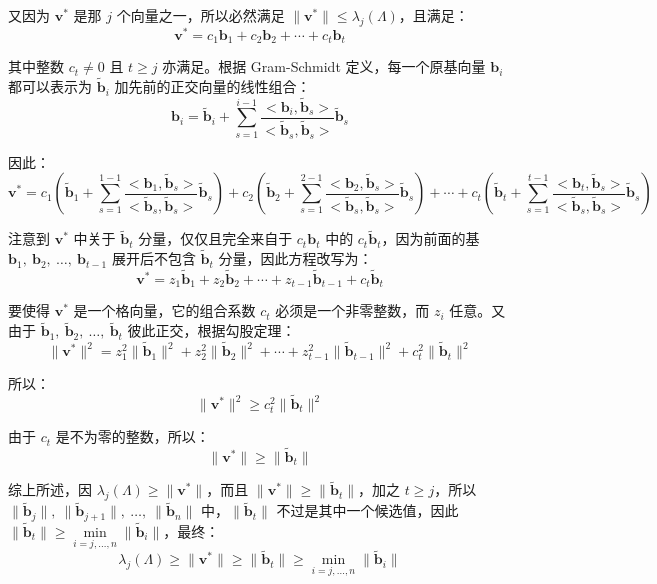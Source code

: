 \documentclass{article}
\begin{document}
又因为 $\bm{v}^*$ 是那 $j$ 个向量之一，所以必然满足 $\|\bm{v}^*\|\leqslant\lambda_j(\Lambda)$，且满足：
\[ \bm{v}^{*}=c_1\bm{b}_1+c_2\bm{b}_2+\cdots+c_t\bm{b}_t \]

其中整数 $c_t\neq0$ 且 $t\geqslant j$ 亦满足。根据 Gram-Schmidt 定义，每一个原基向量 $\bm{b}_i$ 都可以表示为 $\tilde{\bm{b}}_i$ 加先前的正交向量的线性组合：
\[ \bm{b}_i=\tilde{\bm{b}}_i+\sum_{s=1}^{i-1}\dfrac{<\bm{b}_i,\tilde{\bm{b}}_s>}{<\tilde{\bm{b}}_s,\tilde{\bm{b}}_s>}\tilde{\bm{b}}_s \]

因此：
\[ \bm{v}^{*}=c_1\left(\tilde{\bm{b}}_1+\sum_{s=1}^{1-1}\dfrac{<\bm{b}_1,\tilde{\bm{b}}_s>}{<\tilde{\bm{b}}_s,\tilde{\bm{b}}_s>}\tilde{\bm{b}}_s\right)+c_2\left(\tilde{\bm{b}}_2+\sum_{s=1}^{2-1}\dfrac{<\bm{b}_2,\tilde{\bm{b}}_s>}{<\tilde{\bm{b}}_s,\tilde{\bm{b}}_s>}\tilde{\bm{b}}_s\right)+\cdots+c_t\left(\tilde{\bm{b}}_t+\sum_{s=1}^{t-1}\dfrac{<\bm{b}_t,\tilde{\bm{b}}_s>}{<\tilde{\bm{b}}_s,\tilde{\bm{b}}_s>}\tilde{\bm{b}}_s\right) \]

注意到 $\bm{v}^{*}$ 中关于 $\tilde{\bm{b}}_t$ 分量，仅仅且完全来自于 $c_t\bm{b}_t$ 中的 $c_t\tilde{\bm{b}}_t$，因为前面的基 $\bm{b}_1,\ \bm{b}_2,\ \ldots,\ \bm{b}_{t-1}$ 展开后不包含 $\tilde{\bm{b}}_t$ 分量，因此方程改写为：
\[ \bm{v}^{*}=z_1\tilde{\bm{b}}_1+z_2\tilde{\bm{b}}_2+\cdots+z_{t-1}\tilde{\bm{b}}_{t-1}+c_t\tilde{\bm{b}}_t \]

要使得 $\bm{v}^{*}$ 是一个格向量，它的组合系数 $c_t$ 必须是一个非零整数，而 $z_i$ 任意。又由于 $\tilde{\bm{b}}_1,\ \tilde{\bm{b}}_2,\ \ldots,\ \tilde{\bm{b}}_t$ 彼此正交，根据勾股定理：
\[ \|\bm{v}^{*}\|^2=z_1^2\|\tilde{\bm{b}}_1\|^2+z_2^2\|\tilde{\bm{b}}_2\|^2+\cdots+z_{t-1}^2\|\tilde{\bm{b}}_{t-1}\|^2+c_t^2\|\tilde{\bm{b}}_t\|^2 \]

所以：
\[ \|\bm{v}^{*}\|^2\geqslant c_t^2\|\tilde{\bm{b}}_t\|^2 \]

由于 $c_t$ 是不为零的整数，所以：
\[ \|\bm{v}^{*}\|\geqslant\|\tilde{\bm{b}}_t\| \]

综上所述，因 $\lambda_j(\Lambda)\geqslant\|\bm{v}^*\|$，而且 $\|\bm{v}^*\|\geqslant\|\tilde{\bm{b}}_t\|$，加之 $t\geqslant j$，所以 $\|\tilde{\bm{b}}_j\|,\ \|\tilde{\bm{b}}_{j+1}\|,\ \ldots,\ \|\tilde{\bm{b}}_n\|$ 中，$\|\tilde{\bm{b}}_t\|$ 不过是其中一个候选值，因此 $\|\tilde{\bm{b}}_t\|\geqslant\min\limits_{i=j,\ldots,n}\|\tilde{\bm{b}}_i\|$，最终：
\[ \lambda_j(\Lambda)\geqslant\|\bm{v}^{*}\|\geqslant\|\tilde{\bm{b}}_t\|\geqslant\min\limits_{i=j,\ldots,n}\|\tilde{\bm{b}}_i\| \]
\end{document}
